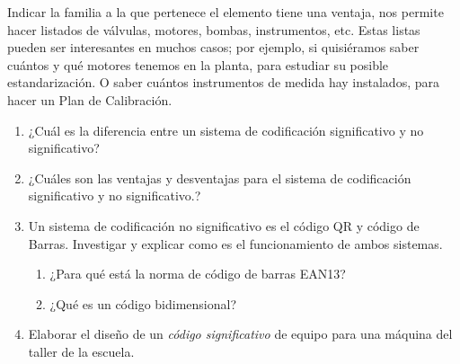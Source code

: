 \documentclass[../main]{subfiles}
\begin{document}
Indicar la familia a la que pertenece el elemento tiene una ventaja, nos
permite hacer listados de válvulas, motores, bombas, instrumentos, etc. Estas listas pueden ser interesantes en muchos casos; por ejemplo, si quisiéramos saber cuántos y qué motores tenemos en la planta, para estudiar su
posible estandarización. O saber cuántos instrumentos de medida hay instalados, para hacer un Plan de Calibración.

\begin{enumerate}
    \item ¿Cuál es la diferencia entre un sistema de codificación significativo y no significativo?
    \item ¿Cuáles son las ventajas y desventajas para el sistema de codificación significativo y no significativo.?
    \item Un sistema de codificación no significativo es el código QR y código de Barras. Investigar y explicar como es el funcionamiento de ambos sistemas.
    \begin{enumerate}
        \item ¿Para qué está la norma de código de barras EAN13?
        \item ¿Qué es un código bidimensional?
    \end{enumerate}
    
    \item Elaborar el diseño de un \emph{código significativo} de equipo para una máquina del taller de la escuela. 
    
\end{enumerate}
\end{document}
